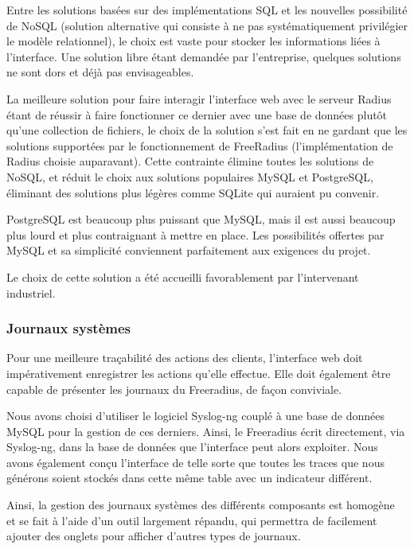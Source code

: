 Entre les solutions basées sur des implémentations SQL et les nouvelles possibilité de NoSQL (solution alternative qui consiste à ne pas systématiquement privilégier le modèle relationnel), le choix est vaste pour stocker les informations liées à l'interface. Une solution libre étant demandée par l'entreprise, quelques solutions ne sont dors et déjà pas envisageables. 

La meilleure solution pour faire interagir l'interface web avec le serveur Radius étant de réussir à faire fonctionner ce dernier avec une base de données plutôt qu'une collection de fichiers, le choix de la solution s'est fait en ne gardant que les solutions supportées par le fonctionnement de FreeRadius (l'implémentation de Radius choisie auparavant). Cette contrainte élimine toutes les solutions de NoSQL, et réduit le choix aux solutions populaires MySQL et PostgreSQL, éliminant des solutions plus légères comme SQLite qui auraient pu convenir.

PostgreSQL est beaucoup plus puissant que MySQL, mais il est aussi beaucoup plus lourd et plus contraignant à mettre en place. Les possibilités offertes par MySQL et sa simplicité conviennent parfaitement aux exigences du projet.

Le choix de cette solution a été accueilli favorablement par l'intervenant industriel.

\subsubsection{Journaux systèmes}

Pour une meilleure traçabilité des actions des clients, l'interface web doit impérativement enregistrer les actions qu'elle effectue. Elle doit également être capable de présenter les journaux du Freeradius, de façon conviviale.

Nous avons choisi d'utiliser le logiciel Syslog-ng couplé à une base de données MySQL pour la gestion de ces derniers. Ainsi, le Freeradius écrit directement, via Syslog-ng, dans la base de données que l'interface peut alors exploiter. Nous avons également conçu l'interface de telle sorte que toutes les traces que nous générons soient stockés dans cette même table avec un indicateur différent.

Ainsi, la gestion des journaux systèmes des différents composants est homogène et se fait à l'aide d'un outil largement répandu, qui permettra de facilement ajouter des onglets pour afficher d'autres types de journaux.

